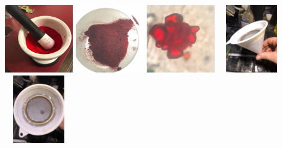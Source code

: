 \documentclass[11pt]{article}
\begin{document}
\begin{center}
\includegraphics[width=3cm, height=3cm]{img/part1_8.jpg}
\includegraphics[width=3cm, height=3cm]{img/part1_9.jpg}
\includegraphics[width=3cm, height=3cm]{img/part1_10.jpg}
\includegraphics[width=3cm, height=3cm]{img/part1_11.jpg}
\includegraphics[width=3cm, height=3cm]{img/part1_12.jpg}
\end{center}
\end{document}
